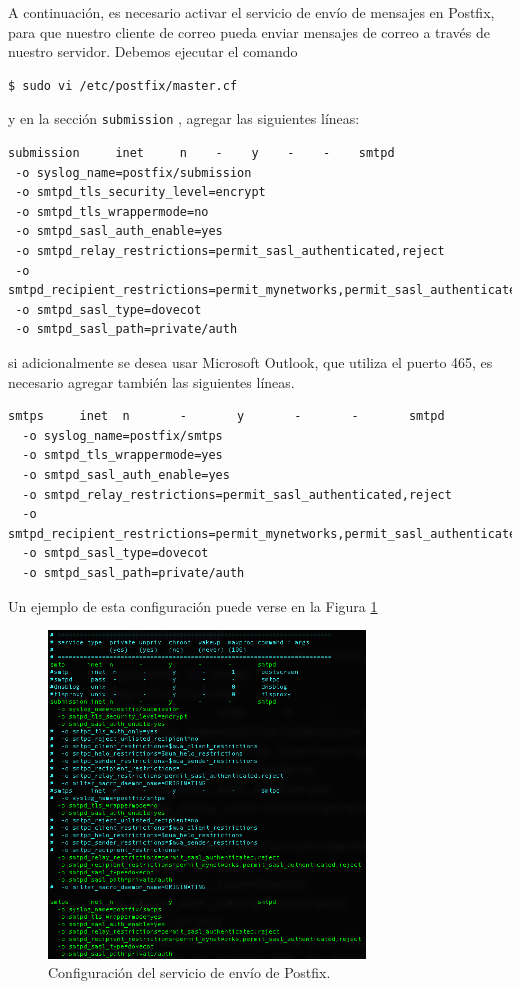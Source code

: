 \documentclass{article}
\newcommand{\ttt}[1]{%
\texttt{#1}%
}
\begin{document}
A continuaci\'on, es necesario activar el servicio
de env\'io de mensajes en Postfix, para que nuestro
cliente de correo pueda enviar mensajes de correo
a trav\'es de nuestro servidor. Debemos ejecutar
el comando
\begin{lstlisting}
$ sudo vi /etc/postfix/master.cf
\end{lstlisting}
y en la secci\'on \ttt{submission}, agregar las
siguientes l\'ineas:
\begin{lstlisting}
submission     inet     n    -    y    -    -    smtpd
 -o syslog_name=postfix/submission
 -o smtpd_tls_security_level=encrypt
 -o smtpd_tls_wrappermode=no
 -o smtpd_sasl_auth_enable=yes
 -o smtpd_relay_restrictions=permit_sasl_authenticated,reject
 -o smtpd_recipient_restrictions=permit_mynetworks,permit_sasl_authenticated,reject
 -o smtpd_sasl_type=dovecot
 -o smtpd_sasl_path=private/auth
\end{lstlisting}
si adicionalmente se desea usar Microsoft Outlook,
que utiliza el puerto 465, es necesario agregar
tambi\'en las siguientes l\'ineas.
\begin{lstlisting}
smtps     inet  n       -       y       -       -       smtpd
  -o syslog_name=postfix/smtps
  -o smtpd_tls_wrappermode=yes
  -o smtpd_sasl_auth_enable=yes
  -o smtpd_relay_restrictions=permit_sasl_authenticated,reject
  -o smtpd_recipient_restrictions=permit_mynetworks,permit_sasl_authenticated,reject
  -o smtpd_sasl_type=dovecot
  -o smtpd_sasl_path=private/auth
\end{lstlisting}
Un ejemplo de esta configuraci\'on puede verse en
la Figura \ref{fig:email-postfixSub}

\begin{figure}[H]
  \centering
  \includegraphics[width=0.75\textwidth]{email/postfixSub}
  \caption{Configuraci\'on del servicio de env\'io de Postfix.}
  \label{fig:email-postfixSub}
\end{figure}
\end{document}
